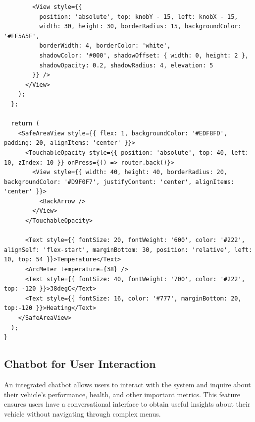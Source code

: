 \begin{lstlisting}
        <View style={{
          position: 'absolute', top: knobY - 15, left: knobX - 15,
          width: 30, height: 30, borderRadius: 15, backgroundColor: '#FF5A5F',
          borderWidth: 4, borderColor: 'white',
          shadowColor: '#000', shadowOffset: { width: 0, height: 2 },
          shadowOpacity: 0.2, shadowRadius: 4, elevation: 5
        }} />
      </View>
    );
  };

  return (
    <SafeAreaView style={{ flex: 1, backgroundColor: '#EDF8FD', padding: 20, alignItems: 'center' }}>
      <TouchableOpacity style={{ position: 'absolute', top: 40, left: 10, zIndex: 10 }} onPress={() => router.back()}>
        <View style={{ width: 40, height: 40, borderRadius: 20, backgroundColor: '#D9F0F7', justifyContent: 'center', alignItems: 'center' }}>
          <BackArrow />
        </View>
      </TouchableOpacity>

      <Text style={{ fontSize: 20, fontWeight: '600', color: '#222', alignSelf: 'flex-start', marginBottom: 30, position: 'relative', left: 10, top: 54 }}>Temperature</Text>
      <ArcMeter temperature={38} />
      <Text style={{ fontSize: 40, fontWeight: '700', color: '#222', top: -120 }}>38degC</Text>
      <Text style={{ fontSize: 16, color: '#777', marginBottom: 20, top:-120 }}>Heating</Text>
    </SafeAreaView>
  );
}
\end{lstlisting}

    \subsection{Chatbot for User Interaction}
An integrated chatbot allows users to interact with the system and inquire about their vehicle's performance, health, and other important metrics. This feature ensures users have a conversational interface to obtain useful insights about their vehicle without navigating through complex menus.

